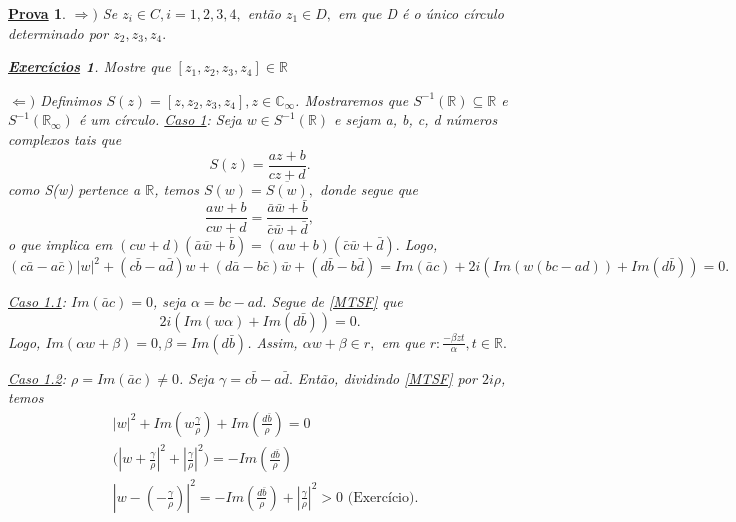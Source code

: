 \documentclass{article}
\newtheorem*{proof*}{\underline{Prova}}
\newtheorem*{exer*}{\underline{Exerc\'icios}}
\begin{document}
\begin{proof*}
  $\Rightarrow)$ Se $z_{i}\in{C}, i=1, 2, 3, 4,$ ent\~ao $z_1\in{D},$ em que D \'e o \'unico c\'irculo determinado por $z_2, z_3, z_4.$
 \begin{exer*}
   Mostre que $[z_1, z_2, z_3, z_4]\in \mathbb{R}$
 \end{exer*}

 $\Leftarrow)$ Definimos $S(z) = [z, z_2, z_3, z_4], z\in \mathbb{C}_{\infty}$. Mostraremos que $S^{-1}(\mathbb{R})\subseteq{\mathbb{R}}$ e $S^{-1}(\mathbb{R}_{\infty})$ \'e um c\'irculo.
 \underline{Caso 1}: Seja $w\in{S^{-1}(\mathbb{R})}$ e sejam a, b, c, d n\'umeros complexos tais que
   $$
   S(z) = \frac{az + b}{cz + d}.
   $$
   como S(w) pertence a $\mathbb{R}$, temos $S(w) = \overline{S(w)},$ donde segue que 
   $$
   \frac{aw + b}{cw + d} = \frac{\bar{a}\bar{w} + \bar{b}}{\bar{c}\bar{w} + \bar{d}},
   $$
   o que implica em $(cw + d)(\bar{a}\bar{w} + \bar{b}) = (aw + b)(\bar{c}\bar{w} + \bar{d}).$ Logo, 
   \begin{equation}\label{MTSF}
     (c\bar{a} - a\bar{c})|w|^2 + (c\bar{b} - a\bar{d})w + (d\bar{a} - b\bar{c})\bar{w} + (d\bar{b} - b\bar{d}) = Im(\bar{a}c) + 2i(Im(w(bc - ad)) + Im(d\bar{b})) = 0.
  \end{equation}

  \underline{Caso 1.1}: $Im(\bar{a}c) = 0$, seja $\alpha = bc - ad.$ Segue de \ref{MTSF} que 
  $$
    2i(Im(w \alpha) + Im(d\bar{b})) = 0.
  $$
Logo, $Im(\alpha w + \beta) = 0, \beta = Im(d\bar{b})$. Assim, $\alpha w + \beta\in r,$ em que $r: \frac{-\beta zt}{\alpha}, t\in \mathbb{R}.$  

\underline{Caso 1.2}: $\rho = Im(\bar{a}c)\neq{0}$. Seja $\gamma = c\bar{b} - a\bar{d}.$ Ent\~ao, dividindo \ref{MTSF} por $2i\rho$, temos
 \begin{align*}
   &|w|^{2} + Im(w \frac{\gamma}{\rho}) + Im(\frac{d\bar{b}}{\rho}) = 0 \\
   &\biggl(|w + \frac{\gamma}{\rho}|^2 + |\frac{\gamma}{\rho}|^2\biggr) = -Im(\frac{d\bar{b}}{\rho}) \\
   &|w - (-\frac{\gamma}{\rho})|^2 = -Im(\frac{d\bar{b}}{\rho}) + |\frac{\gamma}{\rho}|^2 > 0 \text{ (Exerc\'icio).}
 \end{align*}
\end{proof*}
\end{document}
